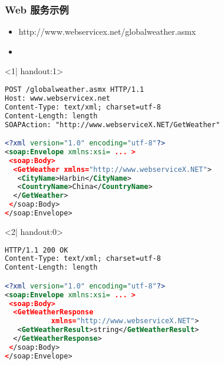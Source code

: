 \begin{frame}[fragile,t]
\frametitle{Web 服务示例}

\begin{itemize}
\item http://www.webservicex.net/globalweather.asmx
\item {} 
\end{itemize}

\begin{onlyenv}<1| handout:1>
\begin{lstlisting}[language=XML, showstringspaces=false]
POST /globalweather.asmx HTTP/1.1
Host: www.webservicex.net
Content-Type: text/xml; charset=utf-8
Content-Length: length
SOAPAction: "http://www.webserviceX.NET/GetWeather"

<?xml version="1.0" encoding="utf-8"?>
<soap:Envelope xmlns:xsi= ... >
 <soap:Body>
  <GetWeather xmlns="http://www.webserviceX.NET">
   <CityName>Harbin</CityName>
   <CountryName>China</CountryName>
  </GetWeather>
 </soap:Body>
</soap:Envelope>
\end{lstlisting}
\end{onlyenv}

\begin{onlyenv}<2| handout:0>
\begin{lstlisting}[language=XML, showstringspaces=false]
HTTP/1.1 200 OK
Content-Type: text/xml; charset=utf-8
Content-Length: length

<?xml version="1.0" encoding="utf-8"?>
<soap:Envelope xmlns:xsi= ... >
 <soap:Body>
  <GetWeatherResponse
           xmlns="http://www.webserviceX.NET">
   <GetWeatherResult>string</GetWeatherResult>
  </GetWeatherResponse>
 </soap:Body>
</soap:Envelope>
\end{lstlisting}
\end{onlyenv}
\end{frame}

